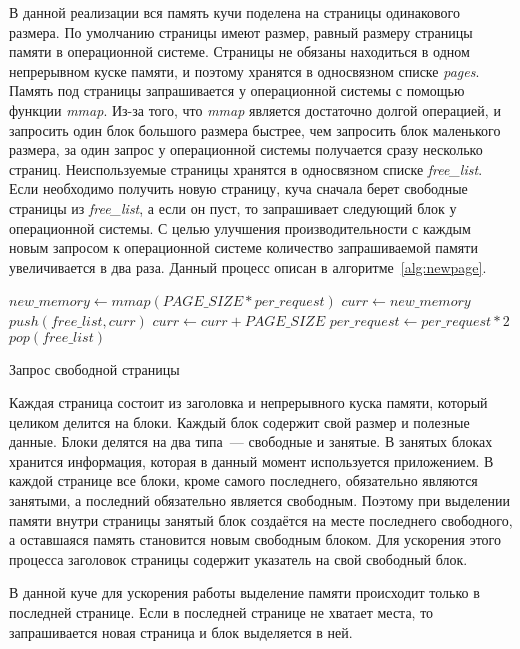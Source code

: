 В данной реализации вся память кучи поделена на страницы одинакового размера. По умолчанию страницы имеют размер, равный размеру страницы памяти в операционной системе. Страницы не обязаны находиться в одном непрерывном куске памяти, и поэтому хранятся в односвязном списке \textit{pages}. Память под страницы запрашивается у операционной системы с помощью функции \textit{mmap}. Из-за того, что \textit{mmap} является достаточно долгой операцией, и запросить один блок большого размера быстрее, чем запросить блок маленького размера, за один запрос у операционной системы получается сразу несколько страниц. Неиспользуемые страницы хранятся в односвязном списке \textit{free\_list}. Если необходимо получить новую страницу, куча сначала берет свободные страницы из \textit{free\_list}, а если он пуст, то запрашивает следующий блок у операционной системы. С целью улучшения производительности с каждым новым запросом к операционной системе количество запрашиваемой памяти увеличивается в два раза. Данный процесс описан в алгоритме~\ref{alg:newpage}.

\begin{algorithm}[h]
\begin{algorithmic}[1]
    \State $new\_memory \gets mmap(PAGE\_SIZE * per\_request)$
    \State $curr \gets new\_memory$
        \State $push(free\_list, curr)$
        \State $curr \gets curr + PAGE\_SIZE$ 
    \EndWhile
    \State $per\_request \gets per\_request * 2$
\EndIf
\State \Return $pop(free\_list)$ 
\end{algorithmic}
\caption{Запрос свободной страницы}\label{alg:newpage}
\end{algorithm}

Каждая страница состоит из заголовка и непрерывного куска памяти, который целиком делится на блоки. Каждый блок содержит свой размер и полезные данные.
Блоки делятся на два типа~--- свободные и занятые. В занятых блоках хранится информация, которая в данный момент используется приложением. В каждой странице все блоки, кроме самого последнего, обязательно являются занятыми, а последний обязательно является свободным. Поэтому при выделении памяти внутри страницы занятый блок создаётся на месте последнего свободного, а оставшаяся память становится новым свободным блоком. Для ускорения этого процесса заголовок страницы содержит указатель на свой свободный блок.

В данной куче для ускорения работы выделение памяти происходит только в последней странице. Если в последней странице не хватает места, то запрашивается новая страница и блок выделяется в ней. 

